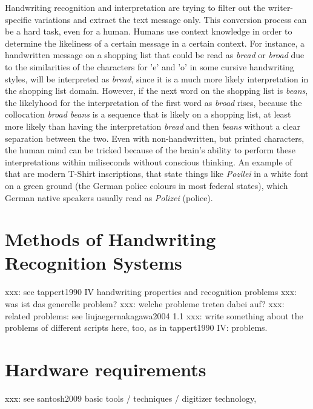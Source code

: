 Handwriting recognition and interpretation are trying to filter out the 
writer-specific variations and extract the text message only. This conversion
process can be a hard task, even for a human. Humans use context knowledge
in order to determine the likeliness of a certain message in a certain context.
For instance, a handwritten message on a shopping list that could be read
as \emph{bread} or \emph{broad} due to the similarities of the characters 
for 'e' and 'o' in some cursive handwriting styles, will be interpreted 
as \emph{bread}, since it is a much more likely interpretation in the 
shopping list domain. However, if the next word on the shopping list 
is \emph{beans}, the likelyhood for the interpretation of the first word
as \emph{broad} rises, because the collocation \emph{broad beans} is a
sequence that is likely on a shopping list, at least more likely than
having the interpretation \emph{bread} and then \emph{beans} without a
clear separation between the two. 
Even with non-handwritten, but printed characters, the human mind can be 
tricked because of the brain's ability to perform these interpretations 
within miliseconds without conscious thinking.
An example of that are modern T-Shirt inscriptions, that state things like
\emph{Pozilei} in a white font on a green ground (the German police colours 
in most federal states), which German native speakers usually read as
\emph{Polizei} (police).

\section{Methods of Handwriting Recognition Systems}
\label{sec:methodsofhwrsystems}
xxx: see tappert1990 IV handwriting properties and recognition problems
xxx: was ist das generelle problem?
xxx: welche probleme treten dabei auf?
xxx: related problems: see liujaegernakagawa2004 1.1
xxx: write something about the problems of different scripts here, too, as in tappert1990 IV: problems.

\section{Hardware requirements}
\label{sec:hardwarerequirements}
xxx: see santosh2009 basic tools / techniques / digitizer technology, 

